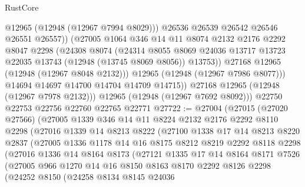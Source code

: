\begin{lexlean}{RustCore}
\begin{coremodule}
                    @12965
                    (@12948 (@12967 @7994 @8029)))
                  @26536
                  @26539
                  @26542
                  @26546
                  @26551
                  @26557))
              (@27005
                @1064
                @346
                @14
                @11
                @8074
                @2132
                @2176
                @2292
                @8047
                @2298
                (@24308
                  @8074
                  (@24314
                    @8055
                    @8069
                    @24036
                    @13717
                    @13723
                    @22035
                    @13743
                    (@12948 (@13745 @8069 @8056))
                    @13753))
                @27168
                @12965
                (@12948 (@12967 @8048 @2132)))
              @12965
              (@12948 (@12967 @7986 @8077)))
            @14694
            @14697
            @14700
            @14704
            @14709
            @14715))
        @27168
        @12965
        (@12948 (@12967 @7978 @2132)))
      @12965
      (@12948 (@12967 @7692 @8092)))
    @22750
    @22753
    @22756
    @22760
    @22765
    @22771
@27722 := @27004
    (@27015
      (@27020 @27566)
      (@27005
        @1339
        @346
        @14
        @11
        @8224
        @2132
        @2176
        @2292
        @8110
        @2298
        (@27016
          @1339
          @14
          @8213
          @8222
          (@27100
            @1338
            @17
            @14
            @8213
            @8220
            @2837
            (@27005
              @1336
              @1178
              @14
              @16
              @8175
              @8212
              @8219
              @2292
              @8118
              @2298
              (@27016
                @1336
                @14
                @8164
                @8173
                (@27121
                  @1335
                  @17
                  @14
                  @8164
                  @8171
                  @7526
                  (@27005
                    @966
                    @1270
                    @14
                    @16
                    @8150
                    @8163
                    @8170
                    @2292
                    @8126
                    @2298
                    (@24252
                      @8150
                      (@24258
                        @8134
                        @8145
                        @24036

\end{coremodule}
\end{lexlean}
